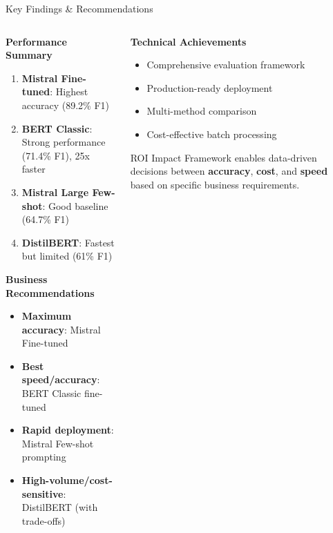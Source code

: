 \documentclass[aspectratio=169]{beamer}
\begin{document}
\begin{frame}{Key Findings \& Recommendations}
\begin{columns}
\begin{column}{0.5\textwidth}
\textbf{Performance Summary}
\begin{enumerate}
\item \textbf{Mistral Fine-tuned}: Highest accuracy (89.2\% F1)
\item \textbf{BERT Classic}: Strong performance (71.4\% F1), 25x faster
\item \textbf{Mistral Large Few-shot}: Good baseline (64.7\% F1)
\item \textbf{DistilBERT}: Fastest but limited (61\% F1)
\end{enumerate}

\vspace{0.3cm}
\textbf{Business Recommendations}
\begin{itemize}
\item \textbf{Maximum accuracy}: Mistral Fine-tuned
\item \textbf{Best speed/accuracy}: BERT Classic fine-tuned
\item \textbf{Rapid deployment}: Mistral Few-shot prompting
\item \textbf{High-volume/cost-sensitive}: DistilBERT (with trade-offs)
\end{itemize}
\end{column}
\begin{column}{0.5\textwidth}
\textbf{Technical Achievements}
\begin{itemize}
\item Comprehensive evaluation framework
\item Production-ready deployment
\item Multi-method comparison
\item Cost-effective batch processing
\end{itemize}

\vspace{0.3cm}
\begin{alertblock}{ROI Impact}
Framework enables data-driven decisions between \textbf{accuracy}, \textbf{cost}, and \textbf{speed} based on specific business requirements.
\end{alertblock}
\end{column}
\end{columns}
\end{frame}
\end{document}
